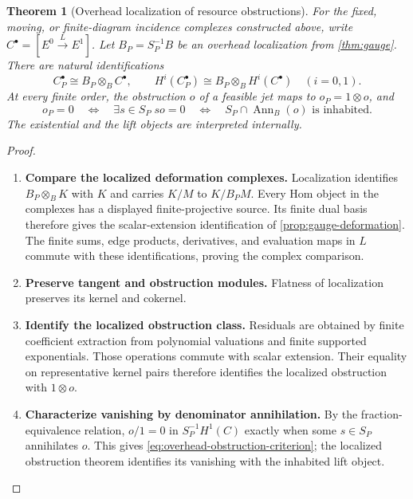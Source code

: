 \documentclass[11pt,a4paper]{article}
\numberwithin{algorithm}{section}
\numberwithin{equation}{section}
\newtheorem{theorem}{Theorem}[section]
\theoremstyle{definition}
\theoremstyle{remark}
\theoremstyle{plain}
\newcommand{\Ann}{\operatorname{Ann}}
\theoremstyle{definition}
\theoremstyle{plain}
\begin{document}
\begin{theorem}[Overhead localization of resource obstructions]
\label{thm:gauge-obstruction-criterion}
For the fixed, moving, or finite-diagram incidence complexes constructed
above, write $C^\bullet=[E^0\xrightarrow{L}E^1]$. Let
$B_P=S_P^{-1}B$ be an overhead localization from \cref{thm:gauge}.
There are natural identifications
\[
 C_P^\bullet\cong B_P\otimes_BC^\bullet,\qquad
 H^i(C_P^\bullet)\cong B_P\otimes_BH^i(C^\bullet)
 \quad(i=0,1).
\]
At every finite order, the obstruction $o$ of a feasible jet maps to
$o_P=1\otimes o$, and
\begin{equation}\label{eq:overhead-obstruction-criterion}
 o_P=0\quad\Longleftrightarrow\quad
 \exists s\in S_P\; so=0
 \quad\Longleftrightarrow\quad
 S_P\cap\Ann_B(o)\text{ is inhabited}.
\end{equation}
The existential and the lift objects are interpreted internally.
\end{theorem}
\begin{proof}\leavevmode
\begin{enumerate}[leftmargin=*,align=left]
\item \textbf{Compare the localized deformation complexes.}
Localization identifies $B_P\otimes_BK$ with $K$ and carries $K/M$
to $K/B_PM$. Every Hom object in the complexes has a displayed
finite-projective source. Its finite dual basis therefore gives the
scalar-extension identification of \cref{prop:gauge-deformation}.
The finite sums, edge products, derivatives, and evaluation maps in
$L$ commute with these identifications, proving the complex comparison.

\item \textbf{Preserve tangent and obstruction modules.}
Flatness of localization preserves its kernel and cokernel.

\item \textbf{Identify the localized obstruction class.}
Residuals are obtained by finite coefficient extraction from polynomial
valuations and finite supported exponentials. Those operations commute
with scalar extension. Their equality on representative kernel pairs
therefore identifies the localized obstruction with $1\otimes o$.

\item \textbf{Characterize vanishing by denominator annihilation.}
By the fraction-equivalence relation, $o/1=0$ in $S_P^{-1}H^1(C)$
exactly when some $s\in S_P$ annihilates $o$. This gives
\eqref{eq:overhead-obstruction-criterion}; the localized obstruction
theorem identifies its vanishing with the inhabited lift object.
\end{enumerate}
\end{proof}
\end{document}
